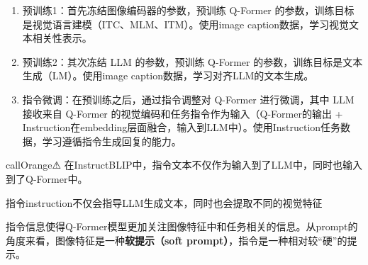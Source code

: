 \documentclass[zihao=false,fontset=windows]{ctexart}
\begin{document}
\begin{enumerate}
\item[\textcolor{feishuBlue}{1.}] 预训练1：首先冻结图像编码器的参数，预训练 Q-Former 的参数，训练目标是视觉语言建模（ITC、MLM、ITM）。使用image caption数据，学习视觉文本相关性表示。

\item[\textcolor{feishuBlue}{2.}] 预训练2：其次冻结 LLM 的参数，预训练 Q-Former 的参数，训练目标是文本生成（LM）。使用image caption数据，学习对齐LLM的文本生成。

\item[\textcolor{feishuBlue}{3.}] 指令微调：在预训练之后，通过指令调整对 Q-Former 进行微调，其中 LLM 接收来自 Q-Former 的视觉编码和任务指令作为输入（\textcolor{feishuBlue}{Q-Former的输出 + Instruction在embedding层面融合，输入到LLM中}）。使用Instruction任务数据，学习遵循指令生成回复的能力。

\end{enumerate}
\begin{feishubox}{callOrange}{⚠}
在InstructBLIP中，指令文本不仅作为输入到了LLM中，同时也输入到了Q-Former中。\par

\textcolor{sourceGreenText}{指令instruction不仅会指导LLM生成文本，同时也会提取不同的视觉特征}\par

\end{feishubox}
指令信息使得Q-Former模型更加关注图像特征中和任务相关的信息。\textcolor{feishuRed}{从prompt的角度来看，图像特征是一种}\textcolor{feishuRed}{\textbf{软提示（soft prompt）}}\textcolor{feishuRed}{，指令是一种相对较“硬”的提示。}\par
\end{document}
